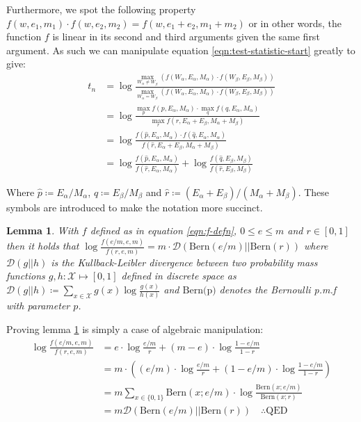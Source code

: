 \documentclass[]{article}
\newcommand{\Xcal}{\mathcal{X}}
\newcommand{\kl}{\mathcal{D}}
\newtheorem{lemma}[theorem]{Lemma}
\begin{document}
Furthermore, we spot the following property $f(w, e_1, m_1) \cdot f(w, e_2, m_2) = f(w, e_1 + e_2, m_1 + m_2)$ or in other words, the function $f$ is linear in its second and third arguments given the same first argument. As such we can manipulate equation \ref{eqn:test-statistic-start} greatly to give:
%
\begin{align}
	t_n &= \log \frac
	{
		\max_{W_{\alpha} \neq W_{\beta}}(f (W_\alpha, E_\alpha, M_\alpha) \cdot f (W_\beta, E_\beta, M_\beta))
	}
	{
		\max_{W_\alpha = W_\beta} (f (W_\alpha, E_\alpha, M_\alpha) \cdot f (W_\beta, E_\beta, M_\beta))
	} \nonumber \\
	&= \log \frac{
		\max_p f(p, E_\alpha, M_\alpha) \cdot \max_q f(q, E_\alpha, M_\alpha)
	}{
		\max_r f(r, E_\alpha + E_\beta, M_\alpha + M_\beta)
	} \nonumber \\
	&= \log \frac{
		f(\hat{p}, E_\alpha, M_\alpha) \cdot f(\hat{q}, E_\alpha, M_\alpha)
	}{
		f(\hat{r}, E_\alpha + E_\beta, M_\alpha + M_\beta)
	} \nonumber \\
	&= \log \frac{f(\hat{p}, E_\alpha, M_\alpha)}{f(\hat{r}, E_\alpha, M_\alpha)} + \log \frac{f(\hat{q}, E_\beta, M_\beta)}{f(\hat{r}, E_\beta, M_\beta)}
\end{align}

Where $\hat{p} \coloneqq E_\alpha / M_\alpha$, $\hat{q} \coloneqq E_\beta / M_\beta$ and $\hat{r} \coloneqq (E_\alpha + E_\beta) / (M_\alpha + M_\beta)$. These symbols are introduced to make the notation more succinct.

\begin{lemma}
	With $f$ defined as in equation \ref{eqn:f-defn}, $0 \leq e \leq m$ and $r \in [0, 1]$ then it holds that $\log \frac{f(e/m, e, m)}{f(r, e, m)} = m \cdot \kl \left( \textrm{Bern}(e/m) || \textrm{Bern}(r) \right)$ where $\kl(g || h)$ is the Kullback-Leibler divergence between two probability mass functions $g, h: \Xcal \mapsto [0, 1]$ defined in discrete space as $\kl(g || h) \coloneqq \sum_{x \in \Xcal} g(x) \log \frac{g(x)}{h(x)}$ and $\textrm{Bern(p)}$ denotes the Bernoulli p.m.f with parameter $p$.
	\label{lem:kl-div}
\end{lemma}

Proving lemma \ref{lem:kl-div} is simply a case of algebraic manipulation:
%
\begin{align}
	\log \frac{f(e/m, e, m)}{f(r, e, m)} &= e \cdot \log \frac{e/m}{r} + (m-e) \cdot \log \frac{1- e/m}{1 - r} \nonumber \\
	&= m \cdot \left( (e/m) \cdot \log \frac{e/m}{r} + (1 - e/m) \cdot \log \frac{1- e/m}{1 - r} \right) \nonumber \\
	&= m \sum_{x \in \{0, 1\}} \textrm{Bern}(x; e/m) \cdot \log \frac{\textrm{Bern}(x; e/m)}{\textrm{Bern}(x; r)} \nonumber \\
	&= m \kl \left( \textrm{Bern}(e/m) || \textrm{Bern}(r) \right) \quad \therefore \textrm{QED}
\end{align}
\end{document}

